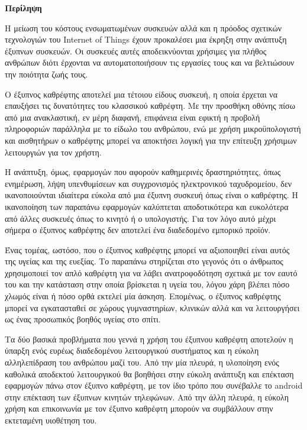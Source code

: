 \begin{center}
  \centering

  \vspace{0.5cm}
  \centering
  \textbf{\Large{Περίληψη}}

  \vspace{1cm}

\end{center}

Η μείωση του κόστους ενσωματωμένων συσκευών αλλά και η πρόοδος σχετικών τεχνολογιών του Internet of Things έχουν προκαλέσει μια έκρηξη στην ανάπτυξη έξυπνων συσκευών. Οι συσκευές αυτές αποδεικνύονται χρήσιμες για πλήθος ανθρώπων διότι έρχονται να αυτοματοποιήσουν τις εργασίες τους και να βελτιώσουν την ποιότητα ζωής τους.

Ο έξυπνος καθρέφτης αποτελεί μια τέτοιου είδους συσκευή, η οποία έρχεται να επαυξήσει τις δυνατότητες του κλασσικού καθρέφτη. Με την προσθήκη οθόνης πίσω από μια ανακλαστική, εν μέρη διαφανή, επιφάνεια είναι εφικτή η προβολή πληροφοριών παράλληλα με το είδωλο του ανθρώπου, ενώ με χρήση μικροϋπολογιστή και αισθητήρων ο καθρέφτης μπορεί να αποκτήσει λογική για την επίτευξη χρήσιμων λειτουργιών για τον χρήστη.

Η ανάπτυξη, όμως, εφαρμογών που αφορούν καθημερινές δραστηριότητες, όπως ενημέρωση, λήψη υπενθυμίσεων και συγχρονισμός ηλεκτρονικού ταχυδρομείου, δεν ικανοποιούνται ιδιαίτερα εύκολα από μια έξυπνη συσκευή όπως είναι ο καθρέφτης. Η ικανοποίηση των παραπάνω εφαρμογών καλύπτεται αποδοτικότερα και ευκολότερα από άλλες συσκευές όπως το κινητό ή ο υπολογιστής. Για τον λόγο αυτό μέχρι σήμερα ο έξυπνος καθρέφτης δεν αποτελεί ένα διαδεδομένο εμπορικό προϊόν.

Ένας τομέας, ωστόσο, που ο έξυπνος καθρέφτης μπορεί να αξιοποιηθεί είναι αυτός της υγείας και της ευεξίας. Το παραπάνω στηρίζεται στο γεγονός ότι ο άνθρωπος χρησιμοποιεί τον απλό καθρέφτη για να λάβει ανατροφοδότηση σχετικά με τον εαυτό του και την κατάσταση στην οποία βρίσκεται η υγεία του, λόγου χάρη βλέπει πόσο χλωμός είναι ή πόσο ορθά εκτελεί μία άσκηση. Επομένως, ο έξυπνος καθρέφτης μπορεί να εγκατασταθεί σε χώρους γυμναστηρίων, κλινικών αλλά και να λειτουργήσει ως ένας προσωπικός βοηθός υγείας στο σπίτι.

Τα δύο βασικά προβλήματα που γεννά η χρήση του έξυπνου καθρέφτη αποτελούν η ύπαρξη ενός ευρέως διαδεδομένου λειτουργικού συστήματος και η εύκολη αλληλεπίδραση του ανθρώπου μαζί του. Από την μία πλευρά, η υλοποίηση ενός καθολικά αποδεκτού λειτουργικού θα βοηθήσει στην εύκολη ανάπτυξη και επέκταση εφαρμογών πάνω στον έξυπνο καθρέφτη, με τον ίδιο τρόπο που συνέβαλλε το android στην επέκταση των έξυπνων κινητών τηλεφώνων. Από την άλλη πλευρά, η εύκολη χρήση και επικοινωνία με τον έξυπνο καθρέφτη μπορούν να συμβάλλουν στην εκτεταμένη υιοθέτηση του.

